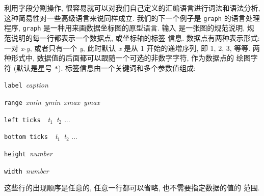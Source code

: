 利用字段分割操作, 很容易就可以对我们自己定义的汇编语言进行词法和语法分析,
这种简易性对一些高级语言来说同样成立. 我们的下一个例子是 \texttt{graph} 
的语言处理程序, \texttt{graph} 是一种用来画数据坐标图的原型语言. 输入
是一张图的规范说明, 规范说明的每一行都表示一个数据点, 或坐标轴的标签
信息. 数据点有两种表示形式: 一对 \textit{x}-\textit{y}, 或者只有一个
\textit{y}, 此时默认 \textit{x} 是从 1 开始的递增序列, 即 1, 2, 3, 等等.
两种形式中, 数据值的后面都可以跟随一个可选的非数字字符, 作为数据点的
绘图字符 (默认是星号 \verb'*').  标签信息由一个关键词和多个参数值组成:
\begin{pattern}
\indent\texttt{label}\ \textit{caption} \par
\indent\texttt{range}\ \textit{xmin}\ \textit{ymin}\ \textit{xmax}\
    \textit{ymax} \par 
\indent\texttt{left ticks}\ \ \textit{t}$_1$\ \textit{t}$_2$ ... \par 
\indent\texttt{bottom ticks}\ \ \textit{t}$_1$\ \textit{t}$_2$ ... \par 
\indent\texttt{height}\ \textit{number}\par
\indent\texttt{width}\ \textit{number}\par
\end{pattern}
这些行的出现顺序是任意的, 任意一行都可以省略, 也不需要指定数据的值的
范围.

